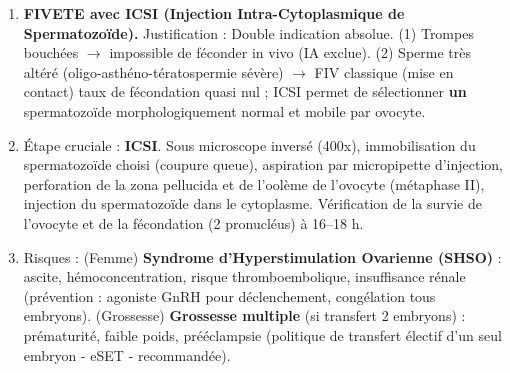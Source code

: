 \documentclass[11pt]{article}
\begin{document}
\begin{corrige}[Exercice 3]
\begin{enumerate}
\item \textbf{FIVETE avec ICSI (Injection Intra-Cytoplasmique de Spermatozoïde).} Justification : Double indication absolue. (1) Trompes bouchées $\rightarrow$ impossible de féconder in vivo (IA exclue). (2) Sperme très altéré (oligo-asthéno-tératospermie sévère) $\rightarrow$ FIV classique (mise en contact) taux de fécondation quasi nul ; ICSI permet de sélectionner \textbf{un} spermatozoïde morphologiquement normal et mobile par ovocyte.
\item Étape cruciale : \textbf{ICSI}. Sous microscope inversé (400x), immobilisation du spermatozoïde choisi (coupure queue), aspiration par micropipette d'injection, perforation de la zona pellucida et de l'oolème de l'ovocyte (métaphase II), injection du spermatozoïde dans le cytoplasme. Vérification de la survie de l'ovocyte et de la fécondation (2 pronucléus) à 16--18 h.
\item Risques : (Femme) \textbf{Syndrome d'Hyperstimulation Ovarienne (SHSO)} : ascite, hémoconcentration, risque thromboembolique, insuffisance rénale (prévention : agoniste GnRH pour déclenchement, congélation tous embryons). (Grossesse) \textbf{Grossesse multiple} (si transfert 2 embryons) : prématurité, faible poids, prééclampsie (politique de transfert électif d'un seul embryon - eSET - recommandée).
\end{enumerate}
\end{corrige}
\end{document}
